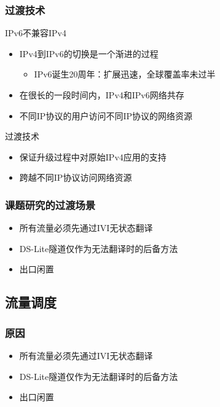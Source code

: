 \documentclass{beamer}
\begin{document}
\begin{frame}
  \frametitle{过渡技术}

  \begin{block}{IPv6不兼容IPv4}
    \begin{itemize}
    \item IPv4到IPv6的切换是一个渐进的过程
      \begin{itemize}
      \item IPv6诞生20周年：扩展迅速，全球覆盖率未过半\footnotemark[1]
      \end{itemize}
    \item 在很长的一段时间内，IPv4和IPv6网络共存
    \item 不同IP协议的用户访问不同IP协议的网络资源
    \end{itemize}
  \end{block}
  \begin{block}{过渡技术}
    \begin{itemize}
    \item 保证升级过程中对原始IPv4应用的支持
    \item 跨越不同IP协议访问网络资源
    \end{itemize}
  \end{block}
\end{frame}

\begin{frame}
  \frametitle{课题研究的过渡场景}

  \vspace{1em}

  \begin{block}{}
    \begin{itemize}
    \item 所有流量必须先通过IVI无状态翻译
    \item DS-Lite隧道仅作为无法翻译时的后备方法
    \item 出口闲置
    \end{itemize}
  \end{block}
\end{frame}

\subsection{流量调度}
\begin{frame}
  \frametitle{原因}

  \vspace{1em}

  \begin{block}{}
    \begin{itemize}
    \item 所有流量必须先通过IVI无状态翻译
    \item DS-Lite隧道仅作为无法翻译时的后备方法
    \item 出口闲置
    \end{itemize}
  \end{block}
\end{frame}
\end{document}
